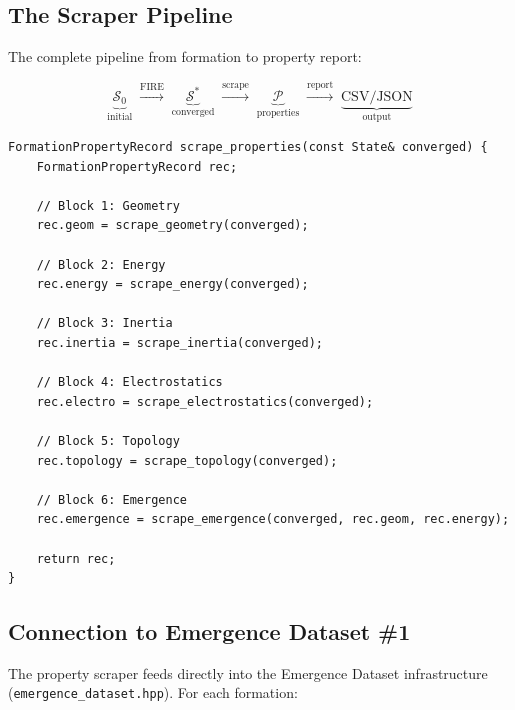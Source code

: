 \documentclass[11pt, a4paper, oneside]{article}
\theoremstyle{definition}
\theoremstyle{remark}
\begin{document}
\subsection{The Scraper Pipeline}
\label{sec:scraper-pipeline}

The complete pipeline from formation to property report:

\begin{equation}
\underbrace{\mathcal{S}_0}_{\text{initial}}
\;\xrightarrow{\text{FIRE}}\;
\underbrace{\mathcal{S}^*}_{\text{converged}}
\;\xrightarrow{\text{scrape}}\;
\underbrace{\mathcal{P}}_{\text{properties}}
\;\xrightarrow{\text{report}}\;
\underbrace{\text{CSV/JSON}}_{\text{output}}
\end{equation}

\begin{lstlisting}[caption={Scraper pipeline (C++)}]
FormationPropertyRecord scrape_properties(const State& converged) {
    FormationPropertyRecord rec;

    // Block 1: Geometry
    rec.geom = scrape_geometry(converged);

    // Block 2: Energy
    rec.energy = scrape_energy(converged);

    // Block 3: Inertia
    rec.inertia = scrape_inertia(converged);

    // Block 4: Electrostatics
    rec.electro = scrape_electrostatics(converged);

    // Block 5: Topology
    rec.topology = scrape_topology(converged);

    // Block 6: Emergence
    rec.emergence = scrape_emergence(converged, rec.geom, rec.energy);

    return rec;
}
\end{lstlisting}

\subsection{Connection to Emergence Dataset \#1}
\label{sec:emergence-dataset-link}

The property scraper feeds directly into the Emergence Dataset
infrastructure (\texttt{emergence\_dataset.hpp}).  For each formation:
\end{document}
